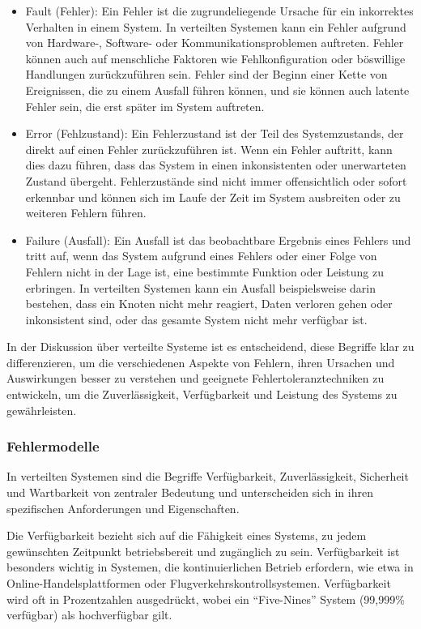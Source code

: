 \begin{itemize}
\item Fault (Fehler): Ein Fehler ist die zugrundeliegende Ursache für ein inkorrektes Verhalten in einem System. In verteilten Systemen kann ein Fehler aufgrund von Hardware-, Software- oder Kommunikationsproblemen auftreten. Fehler können auch auf menschliche Faktoren wie Fehlkonfiguration oder böswillige Handlungen zurückzuführen sein. Fehler sind der Beginn einer Kette von Ereignissen, die zu einem Ausfall führen können, und sie können auch latente Fehler sein, die erst später im System auftreten.
\item Error (Fehlzustand): Ein Fehlerzustand ist der Teil des Systemzustands, der direkt auf einen Fehler zurückzuführen ist. Wenn ein Fehler auftritt, kann dies dazu führen, dass das System in einen inkonsistenten oder unerwarteten Zustand übergeht. Fehlerzustände sind nicht immer offensichtlich oder sofort erkennbar und können sich im Laufe der Zeit im System ausbreiten oder zu weiteren Fehlern führen.
\item Failure (Ausfall): Ein Ausfall ist das beobachtbare Ergebnis eines Fehlers und tritt auf, wenn das System aufgrund eines Fehlers oder einer Folge von Fehlern nicht in der Lage ist, eine bestimmte Funktion oder Leistung zu erbringen. In verteilten Systemen kann ein Ausfall beispielsweise darin bestehen, dass ein Knoten nicht mehr reagiert, Daten verloren gehen oder inkonsistent sind, oder das gesamte System nicht mehr verfügbar ist.
\end{itemize}
In der Diskussion über verteilte Systeme ist es entscheidend, diese Begriffe klar zu differenzieren, um die verschiedenen Aspekte von Fehlern, ihren Ursachen und Auswirkungen besser zu verstehen und geeignete Fehlertoleranztechniken zu entwickeln, um die Zuverlässigkeit, Verfügbarkeit und Leistung des Systems zu gewährleisten.


\subsubsection{Fehlermodelle}

In verteilten Systemen sind die Begriffe Verfügbarkeit, Zuverlässigkeit, Sicherheit und Wartbarkeit von zentraler Bedeutung und unterscheiden sich in ihren spezifischen Anforderungen und Eigenschaften.

Die Verfügbarkeit bezieht sich auf die Fähigkeit eines Systems, zu jedem gewünschten Zeitpunkt betriebsbereit und zugänglich zu sein. Verfügbarkeit ist besonders wichtig in Systemen, die kontinuierlichen Betrieb erfordern, wie etwa in Online-Handelsplattformen oder Flugverkehrskontrollsystemen. Verfügbarkeit wird oft in Prozentzahlen ausgedrückt, wobei ein \enquote{Five-Nines} System (99,999\% verfügbar) als hochverfügbar gilt.

